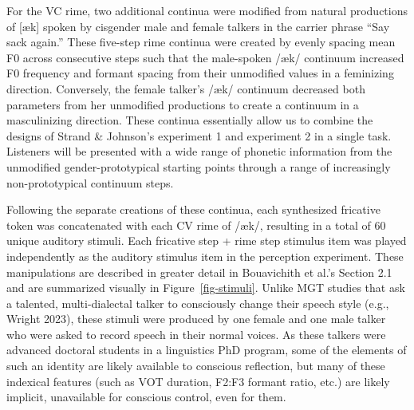 \documentclass[
  letterpaper,
  DIV=11,
  numbers=noendperiod]{scrartcl}
\begin{document}
For the VC rime, two additional continua were modified from natural
productions of {[}æk{]} spoken by cisgender male and female talkers in
the carrier phrase ``Say sack again.'' These five-step rime continua
were created by evenly spacing mean F0 across consecutive steps such
that the male-spoken /æk/ continuum increased F0 frequency and formant
spacing from their unmodified values in a feminizing direction.
Conversely, the female talker's /æk/ continuum decreased both parameters
from her unmodified productions to create a continuum in a masculinizing
direction. These continua essentially allow us to combine the designs of
Strand \& Johnson's experiment 1 and experiment 2 in a single task.
Listeners will be presented with a wide range of phonetic information
from the unmodified gender-prototypical starting points through a range
of increasingly non-prototypical continuum steps.

Following the separate creations of these continua, each synthesized
fricative token was concatenated with each CV rime of /æk/, resulting in
a total of 60 unique auditory stimuli. Each fricative step + rime step
stimulus item was played independently as the auditory stimulus item in
the perception experiment. These manipulations are described in greater
detail in Bouavichith et al.'s Section 2.1 and are summarized visually
in Figure~\ref{fig-stimuli}. Unlike MGT studies that ask a talented,
multi-dialectal talker to consciously change their speech style (e.g.,
Wright 2023), these stimuli were produced by one female and one male
talker who were asked to record speech in their normal voices. As these
talkers were advanced doctoral students in a linguistics PhD program,
some of the elements of such an identity are likely available to
conscious reflection, but many of these indexical features (such as VOT
duration, F2:F3 formant ratio, etc.) are likely implicit, unavailable
for conscious control, even for them.
\end{document}
